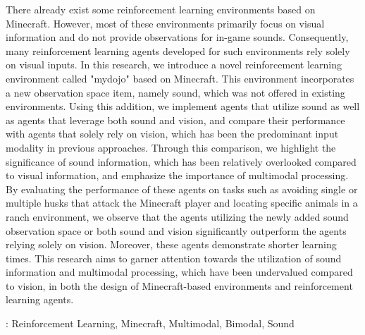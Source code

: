 \documentclass[oneside, under, ko]{snuthesis}
\begin{document}
\begin{center}
    \fontsize{11}{16}\selectfont
    There already exist some reinforcement learning environments based on Minecraft. However, most of these environments primarily focus on visual information and do not provide observations for in-game sounds. Consequently, many reinforcement learning agents developed for such environments rely solely on visual inputs. In this research, we introduce a novel reinforcement learning environment called "mydojo" based on Minecraft. This environment incorporates a new observation space item, namely sound, which was not offered in existing environments. Using this addition, we implement agents that utilize sound as well as agents that leverage both sound and vision, and compare their performance with agents that solely rely on vision, which has been the predominant input modality in previous approaches. Through this comparison, we highlight the significance of sound information, which has been relatively overlooked compared to visual information, and emphasize the importance of multimodal processing. By evaluating the performance of these agents on tasks such as avoiding single or multiple husks that attack the Minecraft player and locating specific animals in a ranch environment, we observe that the agents utilizing the newly added sound observation space or both sound and vision significantly outperform the agents relying solely on vision. Moreover, these agents demonstrate shorter learning times. This research aims to garner attention towards the utilization of sound information and multimodal processing, which have been undervalued compared to vision, in both the design of Minecraft-based environments and reinforcement learning agents.
\end{center}

\vfill\vspace*{\fill}
	\noindent
	{\bfseries \keywordnamealt}: Reinforcement Learning, Minecraft, Multimodal, Bimodal, Sound 
\end{document}
